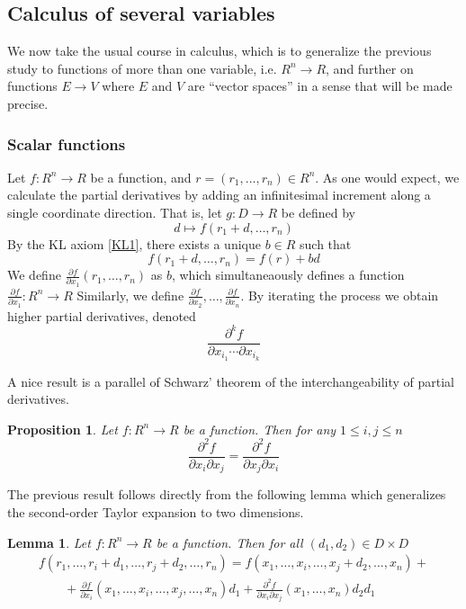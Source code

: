 \documentclass[11pt]{article}
\newtheorem{proposition}{Proposition}[section]
\newtheorem{lemma}{Lemma}[section]
\theoremstyle{definition}
\newcommand{\ddx}[2]{\frac{\partial #1}{\partial #2}} %
\newcommand{\ddxk}[4]{\frac{\partial^{#1} #2}{\partial #3 \cdots \partial #4}} %
\newcommand{\ddxII}[3]{\frac{\partial^{2} #1}{\partial #2 \partial #3}} %
\numberwithin{equation}{section}
\begin{document}
\subsection{Calculus of several variables}
We now take the usual course in calculus, which is to generalize the previous study to functions of more than one variable, i.e. \( R^n\to R \), and further on functions \( E\to V \) where \( E \) and \( V \) are ``vector spaces'' in a sense that will be made precise.

\subsubsection{Scalar functions}
Let \( f:R^n\to R \) be a function, and \( r=(r_1,\dots,r_n)\in R^n \). As one would expect, we calculate the partial derivatives by adding an infinitesimal increment along a single coordinate direction. That is, let \( g: D\to R \) be defined by
\[
  d\mapsto f(r_1+d,\dots,r_n)
\]
By the KL axiom \ref{KL1}, there exists a unique \( b\in R \) such that
\[
  f(r_1+d,\dots,r_n) = f(r) + bd
\]
We define \( \ddx{f}{x_1}(r_1,\dots,r_n)\) as \( b \), which simultaneaously defines a function \( \ddx{f}{x_1}:R^n\to R \) Similarly, we define \( \ddx{f}{x_2},\dots,\ddx{f}{x_n} \). By iterating the process we obtain higher partial derivatives, denoted
\[
  \ddxk{k}{f}{x_{i_1}}{x_{i_k}}
\]

A nice result is a parallel of Schwarz' theorem of the interchangeability of partial derivatives.

\begin{proposition}
  Let \( f:R^n\to R \) be a function. Then for any \( 1\leq i,j\leq n \)
  \[
    \ddxII{f}{x_i}{x_j}= \ddxII{f}{x_j}{x_i}
  \]
  \label{prop:schwarz}
\end{proposition}
The previous result follows directly from the following lemma which generalizes the second-order Taylor expansion to two dimensions.
\begin{lemma}
  Let \( f:R^n \to R \) be a function. Then for all \( (d_1,d_2)\in D\times D \)
  \begin{align*}
    f(r_1,\dots,r_i+d_1,\dots,r_j+d_2,\dots,r_n) = f(x_1,\dots,x_i,\dots,x_j+d_2,\dots,x_n) + \\
    \qquad + \ddx{f}{x_i}(x_1,\dots,x_i,\dots,x_j,\dots,x_n)d_1 + \ddxII{f}{x_i}{x_j}(x_1,\dots,x_n)d_2d_1 
  \end{align*}
\end{lemma}
\end{document}
